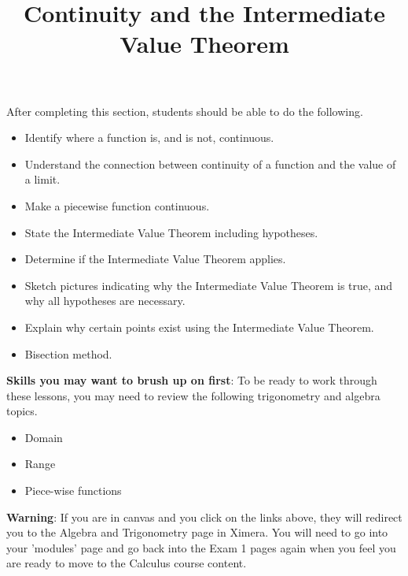 \documentclass{ximera}
\title{Continuity and the Intermediate Value Theorem}
\begin{document}
\begin{abstract}
\end{abstract}

\maketitle

\begin{sectionOutcomes}
After completing this section, students should be able to do the following.

\begin{itemize}
\item Identify where a function is, and is not, continuous.
\item Understand the connection between continuity of a function and
  the value of a limit.
\item Make a piecewise function continuous.
\item State the Intermediate Value Theorem including hypotheses.
\item Determine if the Intermediate Value Theorem applies.
\item Sketch pictures indicating why the Intermediate Value Theorem is
  true, and why all hypotheses are necessary.
\item Explain why certain points exist using the Intermediate Value
  Theorem.
\item Bisection method.
\end{itemize}

\end{sectionOutcomes}

\bigskip

\textbf{Skills you may want to brush up on first}: To be ready to work
through these lessons, you may need to review the following trigonometry and algebra topics.
\begin{itemize}
    \item Domain
    \item Range
    \item Piece-wise functions
\end{itemize}

\bigskip

\textbf{Warning}: If you are in canvas and you click on the links above, they will redirect you
to the Algebra and Trigonometry page in Ximera. You will need to
go into your 'modules' page and go back into the Exam 1 pages again
when you feel you are ready to move to the Calculus course content.
\end{document}
